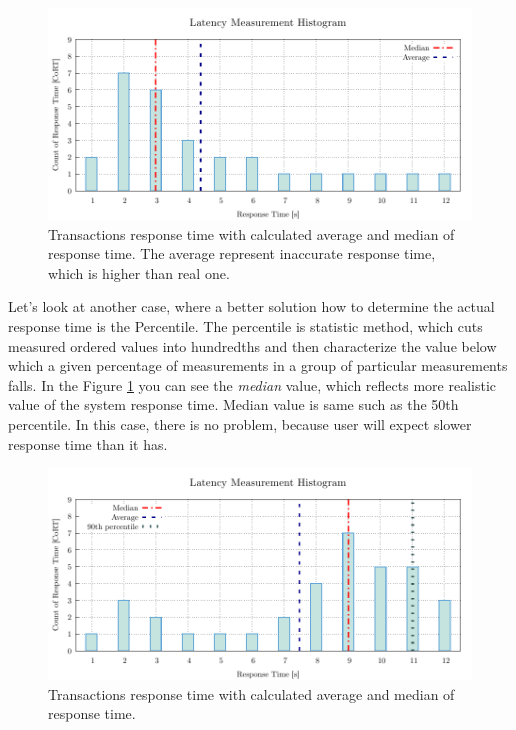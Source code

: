 \begin{figure}[H]
  \centering
  \includegraphics[width=15cm]{obrazky-figures/average_median_1.pdf}
  \caption{Transactions response time with calculated average and median of response time. The average represent inaccurate response time, which is higher than real one.}
  \label{fig:average_percentil_1}
\end{figure}

Let's look at another case, where a better solution how to determine the actual response time is the Percentile. The percentile is statistic method, which cuts measured ordered values into hundredths and then characterize the value below which a given percentage of measurements in a group of particular measurements falls. In the Figure \ref{fig:average_percentil_1} you can see the \emph{median} value, which reflects more realistic value of the system response time. Median value is same such as the 50th percentile. In this case, there is no problem, because user will expect slower response time than it has.

\begin{figure}[H]
  \centering
  \includegraphics[width=15cm]{obrazky-figures/average_median_2.pdf}
  \caption{Transactions response time with calculated average and median of response time.}
  \label{fig:average_percentil_2}
\end{figure}

